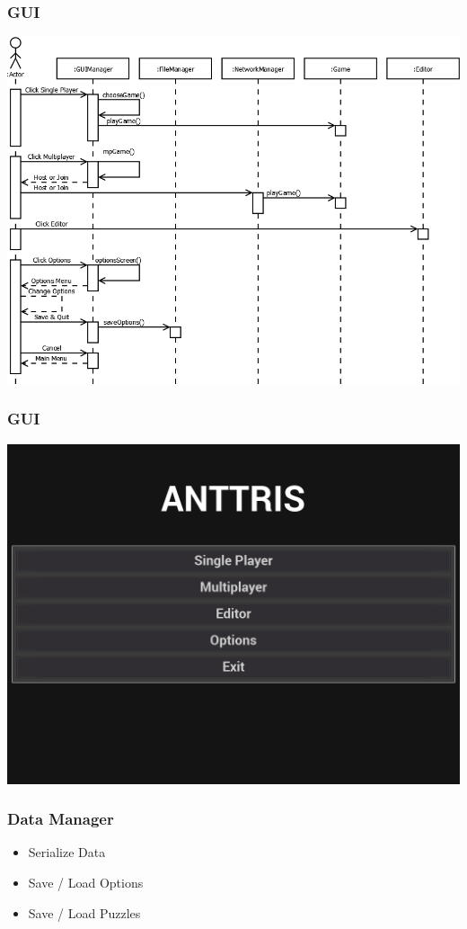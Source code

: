 \documentclass{beamer}
\begin{document}

\begin{frame}
    \frametitle{GUI} %
    \includegraphics[width=1\linewidth]{Anttris_GUISequence.png}
\end{frame}

\begin{frame}
    \frametitle{GUI} %
    \includegraphics[width=1\linewidth]{Anttris_MainMenu.png}
\end{frame}

\begin{frame}
    \frametitle{Data Manager} %
    \begin{itemize}
	\item Serialize Data
	\pause \item Save / Load Options
	\pause \item Save / Load Puzzles
	\end{itemize}
\end{frame}
\end{document}
